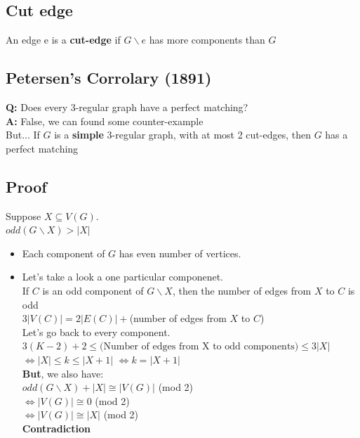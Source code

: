         \subsection{Cut edge}
            An edge e is a \textbf{cut-edge} if $G\backslash e$ has more components than $G$
        \subsection{Petersen's Corrolary (1891)}
            \textbf{Q:} Does every 3-regular graph have a perfect matching?\\
            \textbf{A:} False, we can found some counter-example\\
            But... If $G$ is a \textbf{simple} 3-regular graph, with at most 2 cut-edges, then $G$ has a perfect matching
        \subsection{Proof}
            Suppose $X\subseteq V(G)$.\\
            $odd(G\backslash X)>|X|$\\
            \begin{itemize}
                \item Each component of $G$ has even number of vertices.
                \item Let's take a look a one particular componenet.\\
                    If $C$ is an odd component of $G\backslash X$, then the number of edges from $X$ to $C$ is odd\\
                    $3|V(C)|=2|E(C)|+$(number of edges from $X$ to $C$)\\
                    Let's go back to every component.\\
                    $3(K-2)+2\leq\text{(Number of edges from X to odd components)}\leq 3|X|$\\
                    $\Leftrightarrow |X|\leq k\leq|X+1|$
                    $\Leftrightarrow k=|X+1|$\\
                    \textbf{But}, we also have:\\
                    $odd(G\backslash X)+|X|\cong |V(G)|$ (mod 2)\\
                    $\Leftrightarrow|V(G)|\cong 0$ (mod 2)\\
                    $\Leftrightarrow|V(G)|\cong |X|$ (mod 2)\\
                    \textbf{Contradiction}
            \end{itemize}
